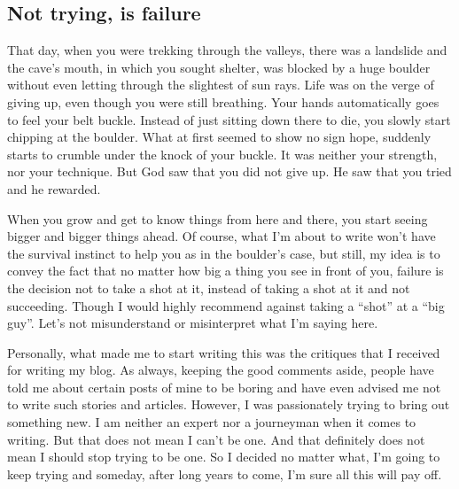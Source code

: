 \documentclass[twoside,11pt,titlepage]{article}
\begin{document}
\newpage
\begin{center}
  \section{Not trying, is failure}
\end{center}
\bigskip
\bigskip
\bigskip

That day, when you were trekking through the valleys, there was a landslide and the cave's mouth, in which you sought shelter, was blocked by a huge boulder without even letting through the slightest of sun rays. Life was on the verge of giving up, even though you were still breathing. Your hands automatically goes to feel your belt buckle. Instead of just sitting down there to die, you slowly start chipping at the boulder. What at first seemed to show no sign hope, suddenly starts to crumble under the knock of your buckle. It was neither your strength, nor your technique. But God saw that you did not give up. He saw that you tried and he rewarded.

When you grow and get to know things from here and there, you start seeing bigger and bigger things ahead. Of course, what I'm about to write won't have the survival instinct to help you as in the boulder's case, but still, my idea is to convey the fact that no matter how big a thing you see in front of you, failure is the decision not to take a shot at it, instead of taking a shot at it and not succeeding. Though I would highly recommend against taking a ``shot'' at a ``big guy''. Let's not misunderstand or misinterpret what I'm saying here.

Personally, what made me to start writing this was the critiques that I received for writing my blog. As always, keeping the good comments aside, people have told me about certain posts of mine to be boring and have even advised me not to write such stories and articles. However, I was passionately trying to bring out something new. I am neither an expert nor a journeyman when it comes to writing. But that does not mean I can't be one. And that definitely does not mean I should stop trying to be one. So I decided no matter what, I'm going to keep trying and someday, after long years to come, I'm sure all this will pay off.
\end{document}
